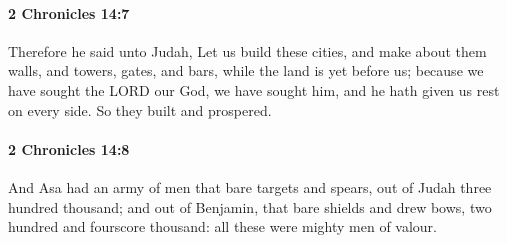 		\paragraph{2 Chronicles 14:7} %
			\label{2CHRONICLES-14-7}

			Therefore he said unto Judah, Let us build these cities, and make about them walls, and towers, gates, and bars, while the land is yet before us; because we have sought the LORD our God, we have sought him, and he hath given us rest on every side. So they built and prospered.


		\paragraph{2 Chronicles 14:8} %
			\label{2CHRONICLES-14-8}

			And Asa had an army of men that bare targets and spears, out of Judah three hundred thousand; and out of Benjamin, that bare shields and drew bows, two hundred and fourscore thousand: all these were mighty men of valour.

